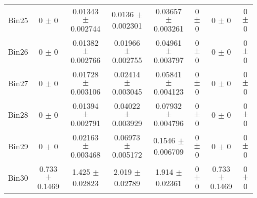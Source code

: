 \begin{tabular}{@{\extracolsep{4pt}}lccccccc@{}}
     Bin25 & 0 $\pm$ 0 & 0.01343 $\pm$ 0.002744 & 0.0136 $\pm$ 0.002301 & 0.03657 $\pm$ 0.003261 & 0 $\pm$ 0 & 0 $\pm$ 0 & 0 $\pm$ 0 \\ 
     Bin26 & 0 $\pm$ 0 & 0.01382 $\pm$ 0.002766 & 0.01966 $\pm$ 0.002755 & 0.04961 $\pm$ 0.003797 & 0 $\pm$ 0 & 0 $\pm$ 0 & 0 $\pm$ 0 \\ 
     Bin27 & 0 $\pm$ 0 & 0.01728 $\pm$ 0.003106 & 0.02414 $\pm$ 0.003045 & 0.05841 $\pm$ 0.004123 & 0 $\pm$ 0 & 0 $\pm$ 0 & 0 $\pm$ 0 \\ 
     Bin28 & 0 $\pm$ 0 & 0.01394 $\pm$ 0.002791 & 0.04022 $\pm$ 0.003929 & 0.07932 $\pm$ 0.004796 & 0 $\pm$ 0 & 0 $\pm$ 0 & 0 $\pm$ 0 \\ 
     Bin29 & 0 $\pm$ 0 & 0.02163 $\pm$ 0.003468 & 0.06973 $\pm$ 0.005172 & 0.1546 $\pm$ 0.006709 & 0 $\pm$ 0 & 0 $\pm$ 0 & 0 $\pm$ 0 \\ 
     Bin30 & 0.733 $\pm$ 0.1469 & 1.425 $\pm$ 0.02823 & 2.019 $\pm$ 0.02789 & 1.914 $\pm$ 0.02361 & 0 $\pm$ 0 & 0.733 $\pm$ 0.1469 & 0 $\pm$ 0 \\ 
\hline\hline
  \end{tabular}
